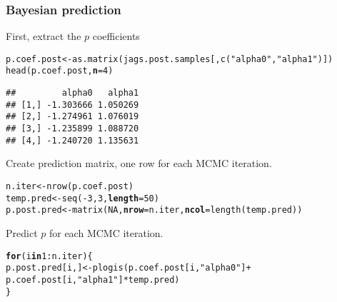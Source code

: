 \documentclass[color=usenames,dvipsnames]{beamer}\usepackage[]{graphicx}\usepackage[]{xcolor}
\makeatletter
\newcommand{\hlnum}[1]{\textcolor[rgb]{0.69,0.494,0}{#1}}%
\newcommand{\hlstr}[1]{\textcolor[rgb]{0.749,0.012,0.012}{#1}}%
\newcommand{\hlopt}[1]{\textcolor[rgb]{0,0,0}{#1}}%
\newcommand{\hlstd}[1]{\textcolor[rgb]{0,0,0}{#1}}%
\newcommand{\hlkwa}[1]{\textcolor[rgb]{0,0,0}{\textbf{#1}}}%
\newcommand{\hlkwb}[1]{\textcolor[rgb]{0,0.341,0.682}{#1}}%
\newcommand{\hlkwc}[1]{\textcolor[rgb]{0,0,0}{\textbf{#1}}}%
\newcommand{\hlkwd}[1]{\textcolor[rgb]{0.004,0.004,0.506}{#1}}%
\newenvironment{kframe}{%
 \def\at@end@of@kframe{}%
 \ifinner\ifhmode%
  \def\at@end@of@kframe{\end{minipage}}%
  \begin{minipage}{\columnwidth}%
 \fi\fi%
 \def\FrameCommand##1{\hskip\@totalleftmargin \hskip-\fboxsep
 \colorbox{shadecolor}{##1}\hskip-\fboxsep
     \hskip-\linewidth \hskip-\@totalleftmargin \hskip\columnwidth}%
 \MakeFramed {\advance\hsize-\width
   \@totalleftmargin\z@ \linewidth\hsize
   \@setminipage}}%
 {\par\unskip\endMakeFramed%
 \at@end@of@kframe}
\newenvironment{knitrout}{}{} %
\newcommand{\inr}[1]{\colorbox{inlinecolor}{\texttt{#1}}}
\makeatother
\begin{document}
\begin{frame}[fragile]
  \frametitle{Bayesian prediction}
  \small
  First, extract the $p$ coefficients
  \vspace{-6pt}
\begin{knitrout}\scriptsize
{}\color{fgcolor}\begin{kframe}
\begin{alltt}
\hlstd{p.coef.post} \hlkwb{<-} \hlkwd{as.matrix}\hlstd{(jags.post.samples[,}\hlkwd{c}\hlstd{(}\hlstr{"alpha0"}\hlstd{,}\hlstr{"alpha1"}\hlstd{)])}
\hlkwd{head}\hlstd{(p.coef.post,} \hlkwc{n}\hlstd{=}\hlnum{4}\hlstd{)}
\end{alltt}
\begin{verbatim}
##         alpha0   alpha1
## [1,] -1.303666 1.050269
## [2,] -1.274961 1.076019
## [3,] -1.235899 1.088720
## [4,] -1.240720 1.135631
\end{verbatim}
\end{kframe}
\end{knitrout}
  \pause
  \vfill
  Create prediction matrix, one row for each MCMC iteration.
  \vspace{-6pt}
\begin{knitrout}\scriptsize
{}\color{fgcolor}\begin{kframe}
\begin{alltt}
\hlstd{n.iter} \hlkwb{<-} \hlkwd{nrow}\hlstd{(p.coef.post)}
\hlstd{temp.pred} \hlkwb{<-} \hlkwd{seq}\hlstd{(}\hlopt{-}\hlnum{3}\hlstd{,} \hlnum{3}\hlstd{,} \hlkwc{length}\hlstd{=}\hlnum{50}\hlstd{)}
\hlstd{p.post.pred} \hlkwb{<-} \hlkwd{matrix}\hlstd{(}\hlnum{NA}\hlstd{,} \hlkwc{nrow}\hlstd{=n.iter,} \hlkwc{ncol}\hlstd{=}\hlkwd{length}\hlstd{(temp.pred))}
\end{alltt}
\end{kframe}
\end{knitrout}
  \pause
  \vfill
  Predict $p$ for each MCMC iteration.
  \vspace{-6pt}
\begin{knitrout}\scriptsize
{}\color{fgcolor}\begin{kframe}
\begin{alltt}
\hlkwa{for}\hlstd{(i} \hlkwa{in} \hlnum{1}\hlopt{:}\hlstd{n.iter) \{}
    \hlstd{p.post.pred[i,]} \hlkwb{<-} \hlkwd{plogis}\hlstd{(p.coef.post[i,}\hlstr{"alpha0"}\hlstd{]} \hlopt{+}
                              \hlstd{p.coef.post[i,}\hlstr{"alpha1"}\hlstd{]}\hlopt{*}\hlstd{temp.pred)}
\hlstd{\}}
\end{alltt}
\end{kframe}
\end{knitrout}
\end{frame}
\end{document}
